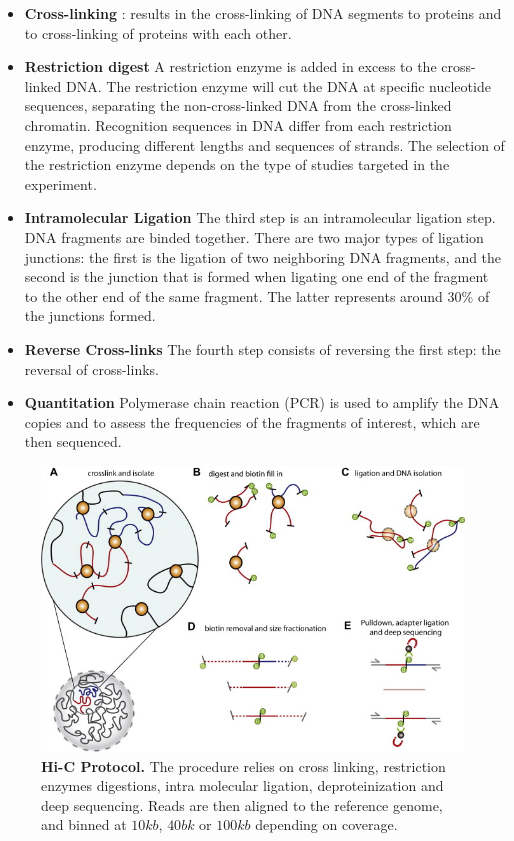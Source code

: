 \begin{itemize}
\item \textbf{Cross-linking} : results in the cross-linking of DNA segments to
proteins and to cross-linking of proteins with each other.
\item \textbf{Restriction digest} A restriction enzyme is added in excess to
the cross-linked DNA. The restriction enzyme will cut the DNA at specific
nucleotide sequences, separating the non-cross-linked DNA from the
cross-linked chromatin. Recognition sequences in DNA differ from each
restriction enzyme, producing different lengths and sequences of strands.
The selection of the restriction enzyme depends on the type of studies
targeted in the experiment.
\item \textbf{Intramolecular Ligation} The third step is an intramolecular
ligation step. DNA fragments are binded together. There are two major types
of ligation junctions: the first is the ligation of two neighboring DNA
fragments, and the second is the junction that is formed when ligating one end
of the fragment to the other end of the same fragment. The latter represents
around 30\% of the junctions formed.
\item \textbf{Reverse Cross-links} The fourth step consists of reversing the
first step: the reversal of cross-links.
\item \textbf{Quantitation} Polymerase chain reaction (PCR) is used to amplify
the DNA copies and to assess the frequencies of the fragments of interest,
which are then sequenced.
\end{itemize}

\begin{figure}
\begin{center}

\includegraphics[width=0.8\linewidth]{figures/hic_protocol.png}
\end{center}
\caption{\textbf{Hi-C Protocol.} The procedure relies on cross linking,
restriction enzymes digestions, intra molecular ligation, deproteinization and
deep sequencing. Reads are then aligned to the reference genome, and binned at
$10kb$, $40bk$ or $100kb$ depending on coverage.}
\end{figure}


